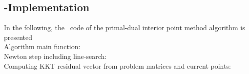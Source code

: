 \subsection{\matlab-Implementation}
In the following, the \matlab \ code of the primal-dual interior point method algorithm is presented\\

Algorithm main function:\\
{\tiny }
Newton step including line-search:\\
{\tiny }
Computing KKT residual vector from problem matrices and current points:\\
{\tiny }